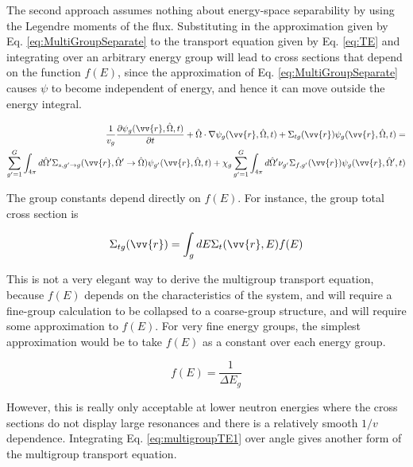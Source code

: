 \documentclass[10pt]{article}
\newcommand{\hO}{\hat{\Omega}}
\begin{document}
\begin{flushleft}
The second approach assumes nothing about energy-space separability by using the Legendre moments of the flux. Substituting in the approximation given by Eq. \ref{eq:MultiGroupSeparate} to the transport equation given by Eq. \ref{eq:TE} and integrating over an arbitrary energy group will lead to cross sections that depend on the function \(f(E)\), since the approximation of Eq. \ref{eq:MultiGroupSeparate} causes \(\psi\) to become independent of energy, and hence it can move outside the energy integral.

\begin{equation}
\label{eq:multigroupTE1}
\begin{aligned}
\frac{1}{v_g}\frac{\partial \psi_g(\vv{r}, \hO  , t)}{\partial t} + \hO  \cdot\nabla\psi_g(\vv{r}, \hO  , t) + \Sigma_{tg}(\vv{r})\psi_g(\vv{r}, \hO  , t) =\\
\sum_{g'=1}^{G} \int_{4\pi}^{} d\hO  ' \Sigma_{s, g'\rightarrow g}(\vv{r}, \hO  ' \rightarrow\hO  )\psi_{g'}(\vv{r}, \hO  , t) + \chi_g \sum_{g'=1}^{G}\int_{4\pi}^{} d\hO  ' \nu_{g'}\Sigma_{f,g'}(\vv{r})\psi_g(\vv{r}, \hO  ', t)
\end{aligned}
\end{equation}

The group constants depend directly on \(f(E)\). For instance, the group total cross section is

\begin{equation}
\label{eq:multigroupTE1_constants1}
\Sigma_{tg}(\vv{r}) = \int_{g} dE \Sigma_t(\vv{r}, E) f(E)
\end{equation}

This is not a very elegant way to derive the multigroup transport equation, because \(f(E)\) depends on the characteristics of the system, and will require a fine-group calculation to be collapsed to a coarse-group structure, and will require some approximation to \(f(E)\). For very fine energy groups, the simplest approximation would be to take \(f(E)\) as a constant over each energy group.

\begin{equation}
\label{eq:FineGroupf_E}
f(E) = \frac{1}{\Delta E_g}
\end{equation}

However, this is really only acceptable at lower neutron energies where the cross sections do not display large resonances and there is a relatively smooth \(1/v\) dependence. Integrating Eq. \ref{eq:multigroupTE1} over angle gives another form of the multigroup transport equation.


\end{flushleft}
\end{document}
